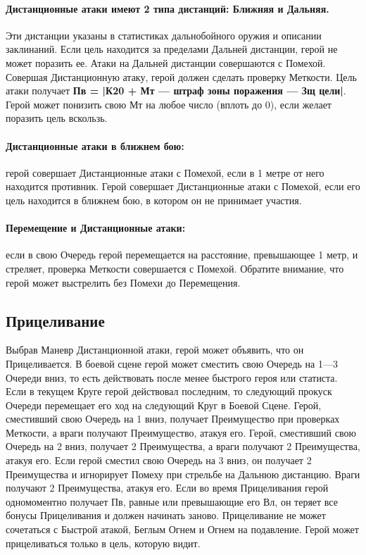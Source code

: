 \paragraph{Дистанционные атаки имеют 2 типа дистанций: Ближняя и Дальняя.} Эти дистанции указаны в статистиках дальнобойного оружия и описании заклинаний. Если цель находится за пределами Дальней дистанции, герой не может поразить ее. Атаки на Дальней дистанции совершаются с Помехой. Совершая Дистанционную атаку, герой должен сделать проверку Меткости. Цель атаки получает \textbf{Пв = |К20 + Мт — штраф зоны поражения — Зщ цели|}. Герой может понизить свою Мт на любое число (вплоть до 0), если желает поразить цель вскользь.
\paragraph{Дистанционные атаки в ближнем бою:} герой совершает Дистанционные атаки с Помехой, если в 1 метре от него находится противник. Герой совершает Дистанционные атаки с Помехой, если его цель находится в ближнем бою, в котором он не принимает участия.
\paragraph{Перемещение и Дистанционные атаки:} если в свою Очередь герой перемещается на расстояние, превышающее 1 метр, и стреляет, проверка Меткости совершается с Помехой. Обратите внимание, что герой может выстрелить без Помехи до Перемещения.
\subsection{Прицеливание}
Выбрав Маневр Дистанционной атаки, герой может объявить, что он Прицеливается. В боевой сцене герой может сместить свою Очередь на 1—3 Очереди вниз, то есть действовать после менее быстрого героя или статиста. Если в текущем Круге герой действовал последним, то следующий прокуск Очереди перемещает его ход на следующий Круг в Боевой Сцене. Герой, сместивший свою Очередь на 1 вниз, получает Преимущество при проверках Меткости, а враги получают Преимущество, атакуя его. Герой, сместивший свою Очередь на 2 вниз, получает 2 Преимущества, а враги получают 2 Преимущества, атакуя его. Если герой сместил свою Очередь на 3 вниз, он получает 2 Преимущества и игнорирует Помеху при стрельбе на Дальнюю дистанцию. Враги получают 2 Преимущества, атакуя его.
\newline
Если во время Прицеливания герой одномоментно получает Пв, равные или превышающие его Вл, он теряет все бонусы Прицеливания и должен начинать заново. Прицеливание не может сочетаться с Быстрой атакой, Беглым Огнем и Огнем на подавление. Герой может прицеливаться только в цель, которую видит.
